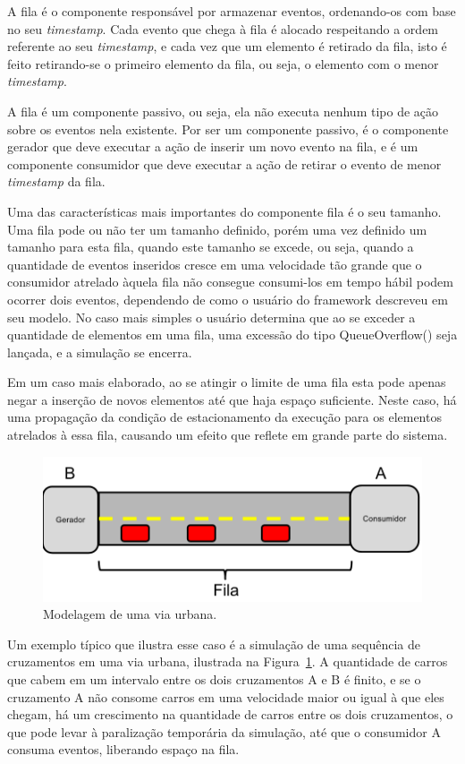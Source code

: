 A fila é o componente responsável por armazenar eventos, ordenando-os com base no seu \textit{timestamp}. Cada evento que chega à fila é alocado respeitando a ordem referente ao seu \textit{timestamp}, e cada vez que um elemento é retirado da fila, isto é feito retirando-se o primeiro elemento da fila, ou seja, o elemento com o menor \textit{timestamp}. 

A fila é um componente passivo, ou seja, ela não executa nenhum tipo de ação sobre os eventos nela existente. Por ser um componente passivo, é o componente gerador que deve executar a ação de inserir um novo evento na fila, e é um componente consumidor que deve executar a ação de retirar o evento de menor \textit{timestamp} da fila.

Uma das características mais importantes do componente fila é o seu tamanho. Uma fila pode ou não ter um tamanho definido, porém uma vez definido um tamanho para esta fila, quando este tamanho se excede, ou seja, quando a quantidade de eventos inseridos cresce em uma velocidade tão grande que o consumidor atrelado àquela fila não consegue consumi-los em tempo hábil podem ocorrer dois eventos, dependendo de como o usuário do framework descreveu em seu modelo. No caso mais simples o usuário determina que ao se exceder a quantidade de elementos em uma fila, uma excessão do tipo QueueOverflow() seja lançada, e a simulação se encerra.

Em um caso mais elaborado, ao se atingir o limite de uma fila esta pode apenas negar a inserção de novos elementos até que haja espaço suficiente. Neste caso, há uma propagação da condição de estacionamento da execução para os elementos atrelados à essa fila, causando um efeito que reflete em grande parte do sistema. 

\begin{figure}
  \centerline{\includegraphics{cruzamento.png}}
  \caption{Modelagem de uma via urbana.}
\label{fig:cruzamento}
\end{figure}

Um exemplo típico que ilustra esse caso é a simulação de uma sequência de cruzamentos em uma via urbana, ilustrada na Figura~\ref{fig:cruzamento}. A quantidade de carros que cabem em um intervalo entre os dois cruzamentos A e B é finito, e se o cruzamento A não consome carros em uma velocidade maior ou igual à que eles chegam, há um crescimento na quantidade de carros entre os dois cruzamentos, o que pode levar à paralização temporária da simulação, até que o consumidor A consuma eventos, liberando espaço na fila.

